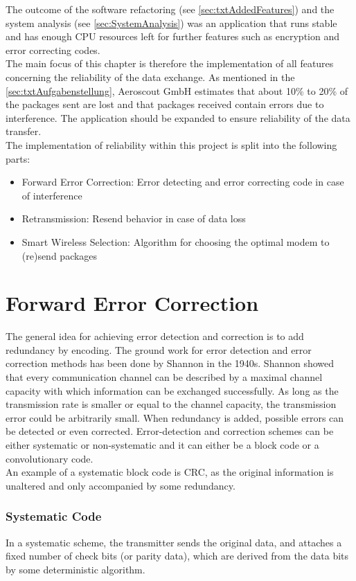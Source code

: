 %
The outcome of the software refactoring (see \autoref{sec:txtAddedFeatures}) and the system analysis (see \autoref{sec:SystemAnalysis}) was an application that runs stable and has enough CPU resources left for further features such as encryption and error correcting codes.\\
The main focus of this chapter is therefore the implementation of all features concerning the reliability of the data exchange. As mentioned in the \autoref{sec:txtAufgabenstellung}, Aeroscout GmbH estimates that about 10\% to 20\% of the packages sent are lost and that packages received contain errors due to interference. The application should be expanded to ensure reliability of the data transfer.\\
The implementation of reliability within this project is split into the following parts:
\begin{itemize}
    \item Forward Error Correction: Error detecting and error correcting code in case of interference
    \item Retransmission: Resend behavior in case of data loss
    \item Smart Wireless Selection: Algorithm for choosing the optimal modem to (re)send packages
\end{itemize}
%
%
%
%
%
\section{Forward Error Correction}
The general idea for achieving error detection and correction is to add redundancy by encoding. The ground work for error detection and error correction methods has been done by Shannon in the 1940s. Shannon showed that every communication channel can be described by a maximal channel capacity with which information can be exchanged successfully. As long as the transmission rate is smaller or equal to the channel capacity, the transmission error could be arbitrarily small. When redundancy is added, possible errors can be detected or even corrected. Error-detection and correction schemes can be either systematic or non-systematic and it can either be a block code or a convolutionary code.\\
An example of a systematic block code is CRC, as the original information is unaltered and only accompanied by some redundancy.
%
\subsubsection{Systematic Code}
In a systematic scheme, the transmitter sends the original data, and attaches a fixed number of check bits (or parity data), which are derived from the data bits by some deterministic algorithm.

